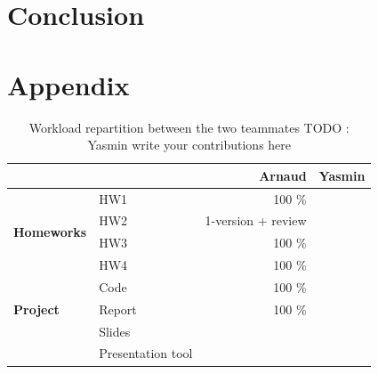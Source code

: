 \documentclass[a4paper,10pt]{article}
\begin{document}
\section{Conclusion}



\section{Appendix}
\FloatBarrier
\begin{table}
  \centering
  \begin{tabular}{llrr} \toprule
                                        &                   & \textbf{Arnaud}    & \textbf{Yasmin} \\ \midrule
    \multirow{4}{*}{\textbf{Homeworks}} & HW1               & 100 \%             &                 \\
                                        & HW2               & 1-version + review &                 \\
                                        & HW3               & 100 \%             &                 \\
                                        & HW4               & 100 \%             &                 \\ \cmidrule{2-4}
    \multirow{3}{*}{\textbf{Project}}   & Code              & 100 \%             &                 \\
                                        & Report            & 100 \%             &                 \\
                                        & Slides            &                    &                 \\
                                        & Presentation tool &                    &                 \\
    \bottomrule
  \end{tabular}
  \caption{ Workload repartition between the two teammates \color{red} TODO : Yasmin write your contributions here}
  \label{tab:nodes}
\end{table}
\end{document}
